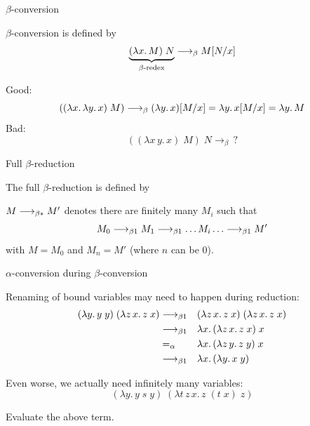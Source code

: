 \begin{frame}{$\beta$-conversion}
\begin{definition}
  $\beta$-conversion is defined by
  \[
    \underbrace{(\lambda x.\, M)\;N}_{\beta\text{-redex}} \longrightarrow_{\beta} M\subst{N}{x}
  \]
\end{definition}
  Good: 
    \[
      ((\lambda x.\,\lambda y.\,x)\;M)
      \longrightarrow_{\beta}
      (\lambda y.\, x)\subst{M}{x}
      = \lambda y.\, x\subst{M}{x}
      = \lambda y.\, M
    \]
  Bad: 
  \[
    ((\lambda x\, y.\, x)\; M)\;N
    \longrightarrow_{\beta} \, ?
  \]
\end{frame}

\begin{frame}{Full $\beta$-reduction}
\begin{definition}
  The \alert{full $\beta$-reduction} is defined by
  \begin{multicols}{2}
    \begin{prooftree}
    \end{prooftree}
    \begin{prooftree}
    \end{prooftree}
    \begin{prooftree}
    \end{prooftree}
    \begin{prooftree}
    \end{prooftree}
  \end{multicols}
\end{definition}
  $M \reduce M'$ denotes there are finitely many $M_i$ such that 
  \[
    M_0 \onereduce M_1 \onereduce \dots M_i \dots \onereduce M' 
  \]
  with $M = M_0$ and $M_n = M'$ (where $n$ can be $0$). 
\end{frame}

\begin{frame}{$\alpha$-conversion during $\beta$-conversion}

  Renaming of bound variables may need to happen during reduction:
  \begin{align*}
    (\lambda y.\, y\; y)\; (\lambda z\,x.\, z\;x) 
  & \onereduce && (\lambda z\,x.\, z\;x)\; (\lambda z\,x.\, z\;x) \\
  & \onereduce && \lambda x.\, (\lambda z\,x.\, z\;x) \;x  \\
  & =_\alpha   && \lambda x.\, (\lambda z\,y.\, z\;y) \;x  \\
  & \onereduce && \lambda x.\, (\lambda y.\, x\;y)
  \end{align*}
  
  Even worse, we actually need infinitely many variables:
  \[
    (\lambda y.\,y\; s\; y)\; (\lambda t\,z\,x.\, z\; (t\; x)\; z)
  \]
  \begin{exercise*}
    Evaluate the above term.
  \end{exercise*}
\end{frame}


